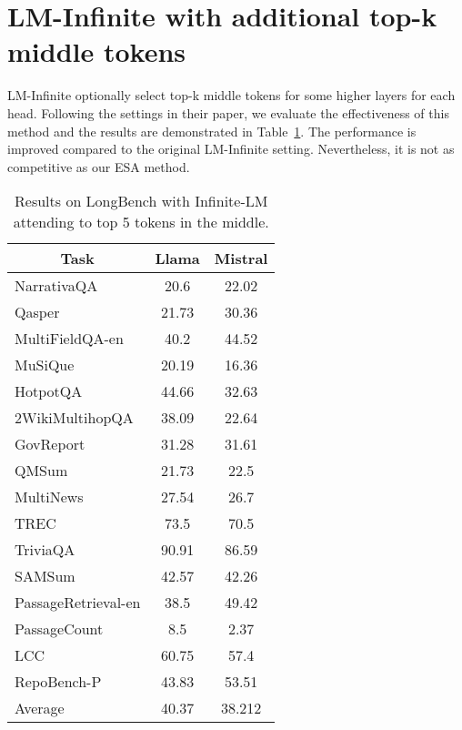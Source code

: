 \section{LM-Infinite with additional top-k middle tokens}
 LM-Infinite optionally select top-k middle tokens for some higher layers for each head. Following the settings in their paper, we evaluate the effectiveness of this method and the results are demonstrated in Table~\ref{tab:infinite-top}. The performance is improved compared to the original LM-Infinite setting. Nevertheless, it is not as competitive as our ESA method.
\begin{table}[]
    \centering
    \begin{tabular}{@{}l|c|c@{}}
        \toprule
        \multicolumn{1}{c|}{Task} & Llama & Mistral \\ \midrule
        NarrativaQA               & 20.6  & 22.02   \\
        Qasper                    & 21.73 & 30.36   \\
        MultiFieldQA-en           & 40.2  & 44.52   \\
        MuSiQue                   & 20.19 & 16.36   \\
        HotpotQA                  & 44.66 & 32.63   \\
        2WikiMultihopQA           & 38.09 & 22.64   \\
        GovReport                 & 31.28 & 31.61   \\
        QMSum                     & 21.73 & 22.5    \\
        MultiNews                 & 27.54 & 26.7    \\
        TREC                      & 73.5  & 70.5    \\
        TriviaQA                  & 90.91 & 86.59   \\
        SAMSum                    & 42.57 & 42.26   \\
        PassageRetrieval-en       & 38.5  & 49.42   \\
        PassageCount              & 8.5   & 2.37    \\
        LCC                       & 60.75 & 57.4    \\
        RepoBench-P               & 43.83 & 53.51   \\ \midrule
        Average                   & 40.37 & 38.212  \\ \bottomrule
    \end{tabular}
    \caption{Results on LongBench with Infinite-LM attending to top 5 tokens in the middle.}
    \label{tab:infinite-top}
\end{table}

